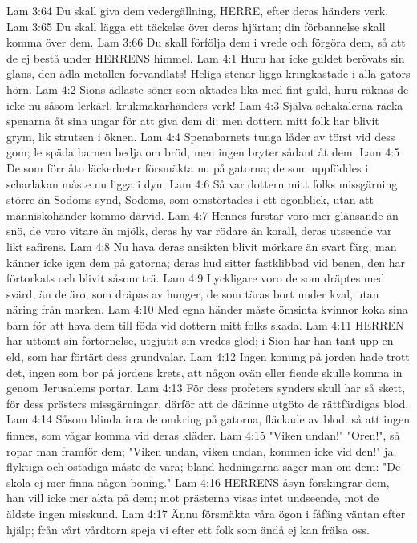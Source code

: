 Lam 3:64  Du skall giva dem vedergällning, HERRE, efter deras händers verk.
Lam 3:65  Du skall lägga ett täckelse över deras hjärtan; din förbannelse skall komma över dem.
Lam 3:66  Du skall förfölja dem i vrede och förgöra dem, så att de ej bestå under HERRENS himmel.
Lam 4:1  Huru har icke guldet berövats sin glans, den ädla metallen förvandlats! Heliga stenar ligga kringkastade i alla gators hörn.
Lam 4:2  Sions ädlaste söner som aktades lika med fint guld, huru räknas de icke nu såsom lerkärl, krukmakarhänders verk!
Lam 4:3  Själva schakalerna räcka spenarna åt sina ungar för att giva dem di; men dottern mitt folk har blivit grym, lik strutsen i öknen.
Lam 4:4  Spenabarnets tunga låder av törst vid dess gom; le späda barnen bedja om bröd, men ingen bryter sådant åt dem.
Lam 4:5  De som förr åto läckerheter försmäkta nu på gatorna; de som uppföddes i scharlakan måste nu ligga i dyn.
Lam 4:6  Så var dottern mitt folks missgärning större än Sodoms synd, Sodoms, som omstörtades i ett ögonblick, utan att människohänder kommo därvid.
Lam 4:7  Hennes furstar voro mer glänsande än snö, de voro vitare än mjölk, deras hy var rödare än korall, deras utseende var likt safirens.
Lam 4:8  Nu hava deras ansikten blivit mörkare än svart färg, man känner icke igen dem på gatorna; deras hud sitter fastklibbad vid benen, den har förtorkats och blivit såsom trä.
Lam 4:9  Lyckligare voro de som dräptes med svärd, än de äro, som dräpas av hunger, de som täras bort under kval, utan näring från marken.
Lam 4:10  Med egna händer måste ömsinta kvinnor koka sina barn för att hava dem till föda vid dottern mitt folks skada.
Lam 4:11  HERREN har uttömt sin förtörnelse, utgjutit sin vredes glöd; i Sion har han tänt upp en eld, som har förtärt dess grundvalar.
Lam 4:12  Ingen konung på jorden hade trott det, ingen som bor på jordens krets, att någon ovän eller fiende skulle komma in genom Jerusalems portar.
Lam 4:13  För dess profeters synders skull har så skett, för dess prästers missgärningar, därför att de därinne utgöto de rättfärdigas blod.
Lam 4:14  Såsom blinda irra de omkring på gatorna, fläckade av blod. så att ingen finnes, som vågar komma vid deras kläder.
Lam 4:15  "Viken undan!" "Oren!", så ropar man framför dem; "Viken undan, viken undan, kommen icke vid den!" ja, flyktiga och ostadiga måste de vara; bland hedningarna säger man om dem: "De skola ej mer finna någon boning."
Lam 4:16  HERRENS åsyn förskingrar dem, han vill icke mer akta på dem; mot prästerna visas intet undseende, mot de äldste ingen misskund.
Lam 4:17  Ännu försmäkta våra ögon i fåfäng väntan efter hjälp; från vårt vårdtorn speja vi efter ett folk som ändå ej kan frälsa oss.

